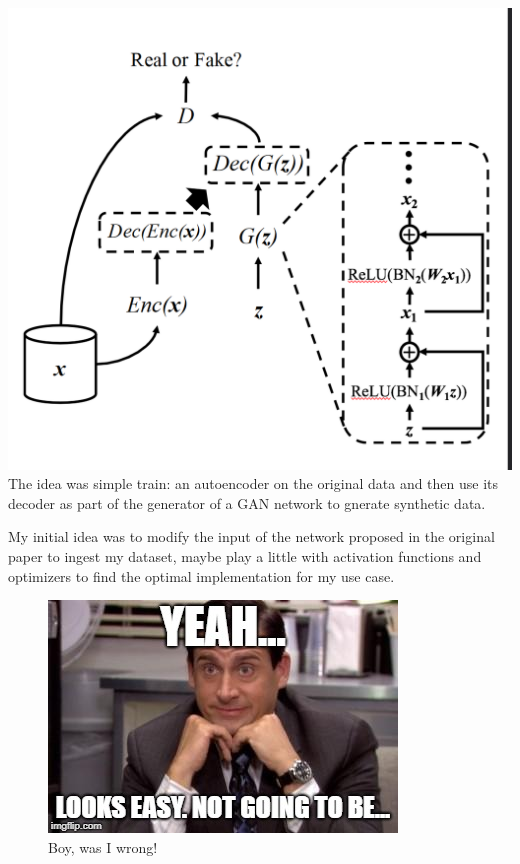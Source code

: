 \documentclass[
  letterpaper,
  DIV=11,
  numbers=noendperiod]{scrreprt}
\begin{document}
\includegraphics{MedGan.png} The idea was simple train: an autoencoder
on the original data and then use its decoder as part of the generator
of a GAN network to gnerate synthetic data.

My initial idea was to modify the input of the network proposed in the
original paper to ingest my dataset, maybe play a little with activation
functions and optimizers to find the optimal implementation for my use
case.

\begin{figure}

{\centering \includegraphics{medgan-meme.jpg}

}

\caption{Boy, was I wrong!}

\end{figure}
\end{document}
